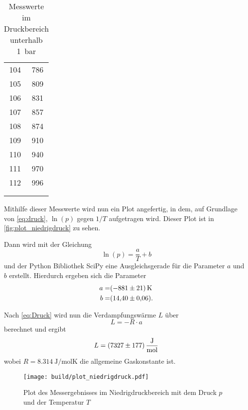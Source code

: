 \begin{table}
\begin{tabular}{S[table-format=3.0] S[table-format=3.0]}
        104 & 786 \\
        105 & 809 \\
        106 & 831 \\
        107 & 857 \\
        108 & 874 \\
        109 & 910 \\
        110 & 940 \\
        111 & 970 \\
        112 & 996 \\
        & \\
        & \\
        \bottomrule
    \end{tabular}
    \caption{Messwerte im Druckbereich unterhalb \SI{1}{bar}}
    \label{tab:niedrigdruck_messwerte}
\end{table}

Mithilfe dieser Messwerte wird nun ein Plot angefertig, in dem, auf Grundlage von \autoref{eq:druck}, $\ln(p)$ gegen $1/T$ aufgetragen wird.
Dieser Plot ist in \autoref{fig:plot_niedrigdruck} zu sehen.

Dann wird mit der Gleichung
\begin{equation}
    \ln(p) = \frac{a}{T} + b
\end{equation}
und der Python Bibliothek SciPy eine Ausgleichsgerade für die Parameter $a$ und $b$ erstellt.\cite{scipy} Hierdurch ergeben sich die Parameter
\begin{align*}
    a =& \SI{-881+-21}{\kelvin} \\
    b =& \SI{14.40+-0.06}{}.
    \label{eq:niedrigdruck_parameter}
\end{align*}

Nach \autoref{eq:Druck} wird nun die Verdampfungswärme $L$ über
\begin{equation}
    L = -R \cdot a
\end{equation}
berechnet und ergibt
\begin{equation*}
    L = \SI{7327+-177}{\joule\per\mol}
\end{equation*}
wobei $R=\SI{8.314}{\joule\per\mol\kelvin}$ die allgemeine Gaskonstante ist.\cite{physics_constants}

\begin{figure}
    \centering
    \texttt{[image: build/plot\_niedrigdruck.pdf]}
    \caption{Plot des Messergebnisses im Niedrigdruckbereich mit dem Druck $p$ und der Temperatur $T$}
    \label{fig:plot_niedrigdruck}
\end{figure}

